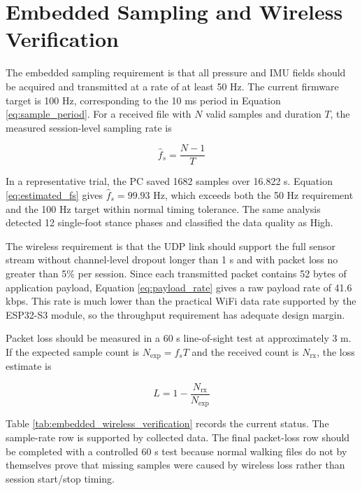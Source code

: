 \section{Embedded Sampling and Wireless Verification}
\label{sec:embedded_wireless_verification}

The embedded sampling requirement is that all pressure and IMU fields should be acquired and transmitted at a rate of at least 50 Hz. The current firmware target is 100 Hz, corresponding to the 10 ms period in Equation \eqref{eq:sample_period}. For a received file with $N$ valid samples and duration $T$, the measured session-level sampling rate is

\begin{equation}
\hat{f}_s = \frac{N-1}{T}
\label{eq:estimated_fs}
\end{equation}

In a representative trial, the PC saved 1682 samples over 16.822 s. Equation \eqref{eq:estimated_fs} gives $\hat{f}_s=99.93$ Hz, which exceeds both the 50 Hz requirement and the 100 Hz target within normal timing tolerance. The same analysis detected 12 single-foot stance phases and classified the data quality as High.

The wireless requirement is that the UDP link should support the full sensor stream without channel-level dropout longer than 1 s and with packet loss no greater than 5\% per session. Since each transmitted packet contains 52 bytes of application payload, Equation \eqref{eq:payload_rate} gives a raw payload rate of 41.6 kbps. This rate is much lower than the practical WiFi data rate supported by the ESP32-S3 module, so the throughput requirement has adequate design margin.

Packet loss should be measured in a 60 s line-of-sight test at approximately 3 m. If the expected sample count is $N_{\mathrm{exp}}=f_sT$ and the received count is $N_{\mathrm{rx}}$, the loss estimate is

\begin{equation}
L =
1-\frac{N_{\mathrm{rx}}}{N_{\mathrm{exp}}}
\label{eq:packet_loss}
\end{equation}

Table \ref{tab:embedded_wireless_verification} records the current status. The sample-rate row is supported by collected data. The final packet-loss row should be completed with a controlled 60 s test because normal walking files do not by themselves prove that missing samples were caused by wireless loss rather than session start/stop timing.

